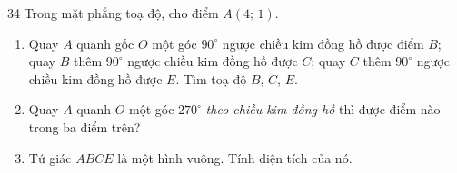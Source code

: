 \begin{probbox}{34}{}
Trong mặt phẳng toạ độ, cho điểm $A(4;\,1)$.
\begin{enumerate}[label=\alph*),leftmargin=1.6em,itemsep=0pt,topsep=2pt]
  \item Quay $A$ quanh gốc $O$ một góc $90^\circ$ ngược chiều kim đồng hồ được điểm $B$; quay $B$ thêm $90^\circ$ ngược chiều kim đồng hồ được $C$; quay $C$ thêm $90^\circ$ ngược chiều kim đồng hồ được $E$. Tìm toạ độ $B$, $C$, $E$.
  \item Quay $A$ quanh $O$ một góc $270^\circ$ \emph{theo chiều kim đồng hồ} thì được điểm nào trong ba điểm trên?
  \item Tứ giác $ABCE$ là một hình vuông. Tính diện tích của nó.
\end{enumerate}
\end{probbox}
